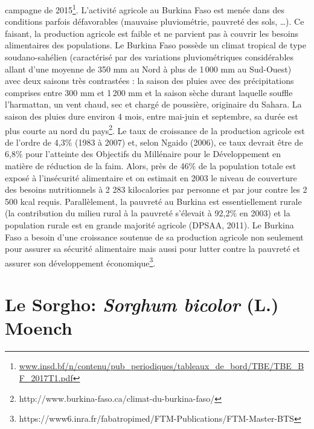 \documentclass[a4paper,11pt]{article}
\begin{document}
campagne de 2015\footnote{\url{www.insd.bf/n/contenu/pub_periodiques/tableaux_de_bord/TBE/TBE_BF_2017T1.pdf}}. L’activité agricole au Burkina Faso est menée dans des
conditions parfois défavorables (mauvaise pluviométrie, pauvreté des
sols, \ldots{}). Ce faisant, la production agricole est faible et ne
parvient pas à couvrir les besoins alimentaires des populations. Le
Burkina Faso possède un climat tropical de type soudano-sahélien
(caractérisé par des variations pluviométriques considérables allant
d’une moyenne de 350 mm au Nord à plus de 1\,000 mm au Sud-Ouest) avec
deux saisons très contrastées : la saison des pluies avec des
précipitations comprises entre 300 mm et 1\,200 mm et la saison sèche
durant laquelle souffle l’harmattan, un vent chaud, sec et chargé de
poussière, originaire du Sahara. La saison des pluies dure environ 4
mois, entre mai-juin et septembre, sa durée est plus courte au nord du
pays\footnote{http://www.burkina-faso.ca/climat-du-burkina-faso/}. Le
taux de croissance de la production agricole est de l’ordre de 4,3\%
(1983 à 2007) et, selon Ngaido (2006), ce taux devrait être de 6,8\%
pour l’atteinte des Objectifs du Millénaire pour le Développement en
matière de réduction de la faim. Alors, près de 46\% de la population
totale est exposé à l’insécurité alimentaire et on estimait en 2003 le
niveau de couverture des besoins nutritionnels à 2 283 kilocalories
par personne et par jour contre les 2\,500 kcal requis. Parallèlement,
la pauvreté au Burkina est essentiellement rurale (la contribution du
milieu rural à la pauvreté s’élevait à 92,2\% en 2003) et la
population rurale est en grande majorité agricole (DPSAA, 2011). Le
Burkina Faso a besoin d’une croissance soutenue de sa production
agricole non seulement pour assurer sa sécurité alimentaire mais aussi
pour lutter contre la pauvreté et assurer son développement
économique\footnote{https://www6.inra.fr/fabatropimed/FTM-Publications/FTM-Master-BTS}.

\section{Le Sorgho: \emph{Sorghum bicolor} (L.) Moench}



\end{document}
